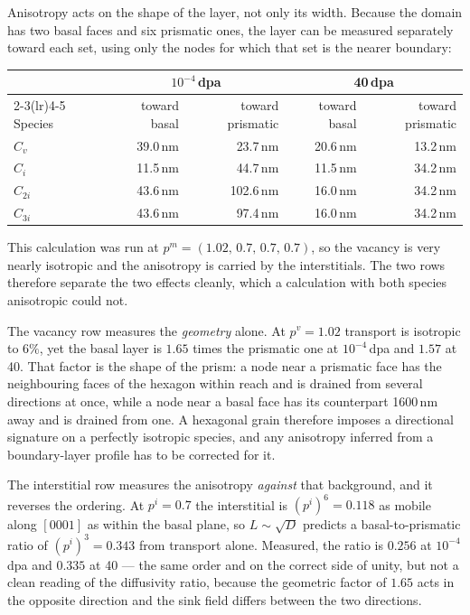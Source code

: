 Anisotropy acts on the shape of the layer, not only its width. Because the
domain has two basal faces and six prismatic ones, the layer can be measured
separately toward each set, using only the nodes for which that set is the
nearer boundary:

\begin{center}
\begin{tabular}{@{}lrrrr@{}}
\toprule
& \multicolumn{2}{c}{$10^{-4}$\,dpa} & \multicolumn{2}{c}{40\,dpa} \\
\cmidrule(lr){2-3}\cmidrule(lr){4-5}
Species & toward basal & toward prismatic & toward basal & toward prismatic \\
\midrule
$C_v$    & 39.0\,nm & 23.7\,nm  & 20.6\,nm & 13.2\,nm \\
$C_i$    & 11.5\,nm & 44.7\,nm  & 11.5\,nm & 34.2\,nm \\
$C_{2i}$ & 43.6\,nm & 102.6\,nm & 16.0\,nm & 34.2\,nm \\
$C_{3i}$ & 43.6\,nm & 97.4\,nm  & 16.0\,nm & 34.2\,nm \\
\bottomrule
\end{tabular}
\end{center}

This calculation was run at $p^{m}=(1.02,\,0.7,\,0.7,\,0.7)$, so the vacancy is
very nearly isotropic and the anisotropy is carried by the interstitials. The
two rows therefore separate the two effects cleanly, which a calculation with
both species anisotropic could not.

The vacancy row measures the \emph{geometry} alone. At $p^{v}=1.02$ transport is
isotropic to $6\%$, yet the basal layer is $1.65$ times the prismatic one at
$10^{-4}\,$dpa and $1.57$ at 40. That factor is the shape of the prism: a node
near a prismatic face has the neighbouring faces of the hexagon within reach and
is drained from several directions at once, while a node near a basal face has
its counterpart 1600\,nm away and is drained from one. A hexagonal grain
therefore imposes a directional signature on a perfectly isotropic species, and
any anisotropy inferred from a boundary-layer profile has to be corrected for it.

The interstitial row measures the anisotropy \emph{against} that background, and
it reverses the ordering. At $p^{i}=0.7$ the interstitial is
$(p^{i})^{6}=0.118$ as mobile along $[0001]$ as within the basal plane, so
$L\sim\sqrt D$ predicts a basal-to-prismatic ratio of $(p^{i})^{3}=0.343$ from
transport alone. Measured, the ratio is $0.256$ at $10^{-4}\,$dpa and $0.335$ at
40 --- the same order and on the correct side of unity, but not a clean reading
of the diffusivity ratio, because the geometric factor of $1.65$ acts in the
opposite direction and the sink field differs between the two directions.

